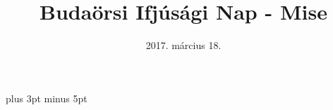 \documentclass[a5paper,twoside]{article}
\title{Budaörsi Ifjúsági Nap - Mise}
\date{2017. március 18.}
\begin{document}

  \versesep=12pt plus 3pt minus 5pt

  \begin{songs}{}
    
    
    
    
  \end{songs}
\end{document}
